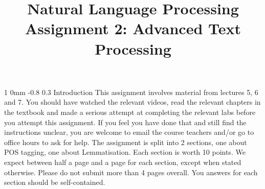 \documentclass[11pt]{article}
\title{{\LARGE Natural Language Processing}\\[1.5mm]{\large Assignment 2: Advanced Text Processing}}%
\author{}
\date{} %
\makeatletter
\renewcommand{\section}{\@startsection
{section}%
{1}%
{0mm}%
{-0.8\baselineskip}%
{0.3\baselineskip}%
{\bfseries\large}}%
\makeatother
\begin{document}


\maketitle

\section{Introduction}
\noindent This assignment involves material from lectures 5, 6 and
7. You should have watched the relevant videos, read the relevant
chapters in the textbook and made a serious attempt at completing the
relevant labs before you attempt this assignment. If you feel you have
done that and still find the instructions unclear, you are welcome to
email the course teachers and/or go to office hours to ask for help.
The assignment is split into 2 sections, one about POS tagging,
one about Lemmatisation. Each section is worth 10 points. We
expect between half a page and a page for each section, except when
stated otherwise. Please do not submit more than 4 pages overall.  You
answers for each section should be self-contained.  
\end{document}
